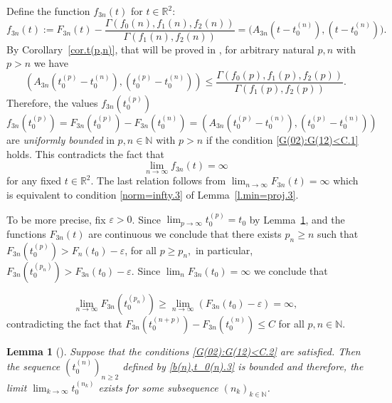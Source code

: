 \documentclass[preprint,12pt]{elsarticle}
\newtheorem{lem}[thm]{Lemma}
\numberwithin{equation}{section}
\begin{document}
%
%
\iffalse
Define the function $f_{3n}(t)$ for $t\in \mathbb R^2$:
\begin{equation}
 \label{f_3n(t)}
 f_{3n}(t):=F_{3n}(t)-
\frac{\Gamma(f_0(n),f_1(n),f_2(n))}{\Gamma(f_1(n),f_2(n))}=
\big(A_{3n}(t-t_0^{(n)}),(t-t_0^{(n)})\big). 
\end{equation}
By Corollary~\ref{cor.t(p,n)},   that will be proved in \cite{Kos-m-Arx23,Kos-hpl-arx20},
for arbitrary natural $p,n$ with $p>n$ we have
%
\begin{equation*}
(A_{3n}(t_0^{(p)}-t_0^{(n)}),(t_0^{(p)}-t_0^{(n)}))
\leq
\frac{\Gamma(f_0(p),f_1(p),f_2(p))}{\Gamma(f_1(p),f_2(p))}.
\end{equation*}
Therefore,  the values $f_{3n}(t_0^{(p)})$  
$$
 f_{3n}(t_0^{(p)})=F_{3n}(t_0^{(p)})-F_{3n}(t_0^{(n)})=
(A_{3n}(t_0^{(p)}-t_0^{(n)}),(t_0^{(p)}-t_0^{(n)})) 
 $$
are {\it uniformly bounded} in $p,n\in \mathbb N$ with $p>n$ if the condition \eqref{G(02):G(12)<C.1} 
holds. This  contradicts the fact that 
\begin{equation}
 \label{f_(3n)-inf}
\lim_{n\to\infty}f_{3n}(t)=\infty
\end{equation}
for any fixed $t\in \mathbb R^2$.
The last relation follows  from $\lim_{n\to\infty}F_{3n}(t)=\infty$ which is equivalent to condition \eqref{norm=infty.3} of Lemma~\ref{l.min=proj.3}. 

To be more precise, fix $\varepsilon>0$.  Since $\lim_{p\to\infty} t_0^{(p)}=t_0$ by Lemma~\ref{l.lim_nt_n}, and the functions $F_{3n}(t)$ are continuous
we conclude that there exists $p_n\geq n$ such that
$
F_{3n}(t_0^{(p)})>F_n(t_0)-\varepsilon$, for all $p\geq p_n,
$
in particular, $F_{3n}(t_0^{(p_n)})>F_{3n}(t_0)-\varepsilon$. Since $\lim_nF_{3n}(t_0)=\infty$ we conclude that

$$
\lim_{n\to\infty}F_{3n}(t_0^{(p_n)})\geq \lim_{n\to\infty}(F_{3n}(t_0)-\varepsilon)=\infty,
$$
contradicting the fact that $F_{3n}(t_0^{(n+p)})-F_{3n}(t_0^{(n)})\leq C$ for all $p,n\in {\mathbb N}$.

\begin{lem} [\cite{Kos-m-Arx23, Kos-hpl-arx20}] 
\label{l.lim_nt_n}
Suppose that the conditions 
\eqref{G(02):G(12)<C.2} are satisfied. Then
the  sequence $(t_0^{(n)})_{n\geq 2}$
defined by \eqref{b(n),t_0(n).3}
is bounded and therefore,  the limit $\lim_{k\to\infty}t_0^{(n_k)}$ exists for some 
subsequence $(n_k)_{k\in \mathbb N}$.
\end{lem}
%
\end{document}
